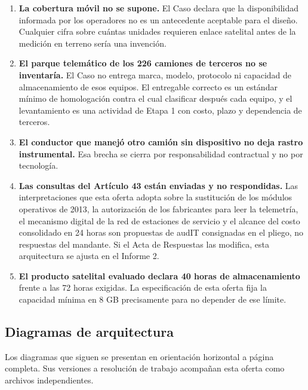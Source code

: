 \begin{enumerate}
    \item \textbf{La cobertura móvil no se supone.} El Caso declara que la disponibilidad informada
    por los operadores no es un antecedente aceptable para el diseño. Cualquier cifra sobre cuántas
    unidades requieren enlace satelital antes de la medición en terreno sería una invención.
    \item \textbf{El parque telemático de los 226 camiones de terceros no se inventaría.} El Caso
    no entrega marca, modelo, protocolo ni capacidad de almacenamiento de esos equipos. El
    entregable correcto es un estándar mínimo de homologación contra el cual clasificar después
    cada equipo, y el levantamiento es una actividad de Etapa 1 con costo, plazo y dependencia de
    terceros.
    \item \textbf{El conductor que manejó otro camión sin dispositivo no deja rastro
    instrumental.} Esa brecha se cierra por responsabilidad contractual y no por tecnología.
    \item \textbf{Las consultas del Artículo 43 están enviadas y no respondidas.} Las
    interpretaciones que esta oferta adopta sobre la sustitución de los módulos operativos de 2013,
    la autorización de los fabricantes para leer la telemetría, el mecanismo digital de la red de
    estaciones de servicio y el alcance del costo consolidado en 24 horas son propuestas de audIT
    consignadas en el pliego, no respuestas del mandante. Si el Acta de Respuestas las modifica,
    esta arquitectura se ajusta en el Informe 2.
    \item \textbf{El producto satelital evaluado declara 40 horas de almacenamiento}
    \parencite{webfleet_sat} frente a las 72 horas exigidas. La especificación de esta oferta fija
    la capacidad mínima en 8 GB precisamente para no depender de ese límite.
\end{enumerate}


\subsection{Diagramas de arquitectura}

Los diagramas que siguen se presentan en orientación horizontal a página completa. Sus versiones a resolución de trabajo acompañan esta oferta como archivos independientes.


